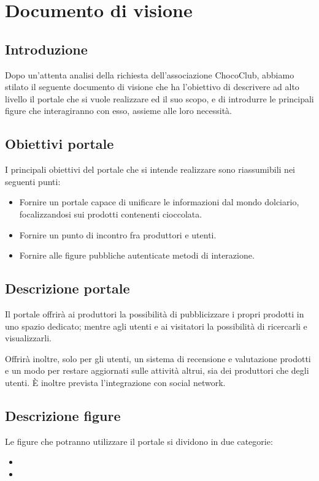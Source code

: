\chapter{Documento di visione} 
\label{cha:documento_di_visione}

\section{Introduzione}
Dopo un'attenta analisi della richiesta dell'associazione ChocoClub, abbiamo stilato il seguente documento di visione che ha l'obiettivo di descrivere ad alto livello il portale che si vuole realizzare ed il suo scopo, e di introdurre le principali figure che interagiranno con esso, assieme alle loro necessità.

\section{Obiettivi portale} 
\label{sec:obiettivi_portale}
I principali obiettivi del portale che si intende realizzare sono riassumibili nei seguenti punti:
\begin{itemize}
	\item Fornire un portale capace di unificare le informazioni dal mondo dolciario, focalizzandosi sui prodotti contenenti cioccolata.
	\item Fornire un punto di incontro fra produttori e utenti.
	\item Fornire alle figure pubbliche autenticate metodi di interazione.
\end{itemize}

\section{Descrizione portale}
\label{sec:descrizione_portale}
Il portale offrirà ai produttori la possibilità di pubblicizzare i propri prodotti in uno spazio dedicato; mentre agli utenti e ai visitatori la possibilità di ricercarli e visualizzarli. 

Offrirà inoltre, solo per gli utenti, un sistema di recensione e valutazione prodotti e un modo per restare aggiornati sulle attività altrui, sia dei produttori che degli utenti.
È inoltre prevista l'integrazione con social network.

\section{Descrizione figure} 
\label{sec:descrizione_figure}
Le figure che potranno utilizzare il portale si dividono in due categorie:
\begin{itemize}
	\item {}
	\item {}
\end{itemize}

